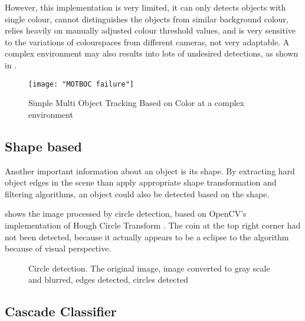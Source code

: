 However, this implementation is very limited, it can only detects objects with single colour, cannot distinguishes the objects from similar background colour, relies heavily on manually adjusted colour threshold values, and is very sensitive to the variations of colourspaces from different cameras, not very adaptable. A complex environment may also results into lots of undesired detections, as shown in .

\begin{figure}[H]
  \centering
  \texttt{[image: "MOTBOC failure"]}
  \caption{Simple Multi Object Tracking Based on Color \cite{MOTBOC.git} at a complex environment}
  \label{Figure:MOTBOC_F}
\end{figure}

\subsection{Shape based}

Another important information about an object is its shape. By extracting hard object edges in the scene than apply appropriate shape transformation and filtering algorithms, an object could also be detected based on the shape.

 shows the image processed by circle detection, based on OpenCV's implementation of Hough Circle Transform \cite{opencv:hough_circle}. The coin at the top right corner had not been detected, because it actually appears to be a eclipse to the algorithm because of visual perspective.

\begin{figure}[H]
  \centering
  \caption{Circle detection.  The original image,  image converted to gray scale and blurred,  edges detected,  circles detected}
  \label{Figure:circles}
\end{figure}

\subsection{Cascade Classifier}

